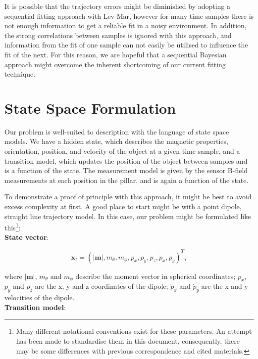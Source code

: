 \documentclass[10pt, a4paper, twocolumn]{article} %
\begin{document}
It is possible that the trajectory errors might be diminished by adopting a sequential fitting approach with Lev-Mar, however for many time samples there is not enough information to get a reliable fit in a noisy environment. In addition, the strong correlations between samples is ignored with this approach, and information from the fit of one sample can not easily be utilised to influence the fit of the next. For this reason, we are hopeful that a sequential Bayesian approach might overcome the inherent shortcoming of our current fitting technique.

\section{State Space Formulation}
\label{State_space}

Our problem is well-suited to description with the language of state space models. We have a hidden state, which describes the magnetic properties, orientation, position, and velocity of the object at a given time sample, and a transition model, which updates the position of the object between samples and is a function of the state. The measurement model is given by the sensor B-field measurements at each position in the pillar, and is again a function of the state.

To demonstrate a proof of principle with this approach, it might be best to avoid excess complexity at first. A good place to start might be with a point dipole, straight line trajectory model. In this case, our problem might be formulated like this\footnote{Many different notational conventions exist for these parameters. An attempt has been made to standardise them in this document, consequently, there may be some differences with previous correspondence and cited materials.}:\\

\textbf{State vector}:

\begin{equation}
	\mathbf{x}_t = (\lvert \mathbf{m} \rvert, m_\theta, m_\phi, p_x,
	p_y, p_z, \dot p_x, \dot p_y)^T,
\end{equation}

where $\lvert \mathbf{m} \rvert$, $m_\theta$ and $m_\phi$ describe the moment vector in spherical coordinates; $p_x$, $p_y$ and $p_z$ are the x, y and z coordinates of the dipole; $\dot p_x$ and $\dot p_y$ are the x and y velocities of the dipole.\\

\textbf{Transition model}:
\end{document}
